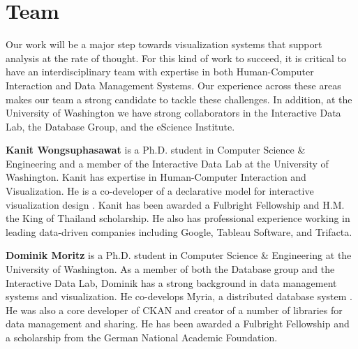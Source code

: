 \section*{Team}

Our work will be a major step towards visualization systems that support analysis at the rate of thought.  For this kind of work to succeed, it is critical to have an interdisciplinary team with expertise in both Human-Computer Interaction and Data Management Systems. Our experience across these areas makes our team a strong candidate to tackle these challenges.  In addition, at the University of Washington we have strong collaborators in the Interactive Data Lab, the Database Group, and the eScience Institute.

\textbf{Kanit Wongsuphasawat} is a Ph.D. student in Computer Science \& Engineering and a member of the Interactive Data Lab at the University of Washington.  Kanit has expertise in Human-Computer Interaction and Visualization.  He is a co-developer of a declarative model for interactive visualization design \cite{satyanarayan:reactive-vega}.  Kanit has been awarded a Fulbright Fellowship and H.M. the King of Thailand scholarship.  He also has professional experience working in leading data-driven companies including Google, Tableau Software, and Trifacta.

\textbf{Dominik Moritz} is a Ph.D. student in Computer Science \& Engineering at the University of Washington.   As a member of both the Database group and the Interactive Data Lab, Dominik has a strong background in data management systems and visualization.  He co-develops Myria, a distributed database system \cite{halperin:myria}.  He was also a core developer of CKAN and creator of a number of libraries for data management and sharing.  He has been awarded a Fulbright Fellowship and a scholarship from the German National Academic Foundation.
